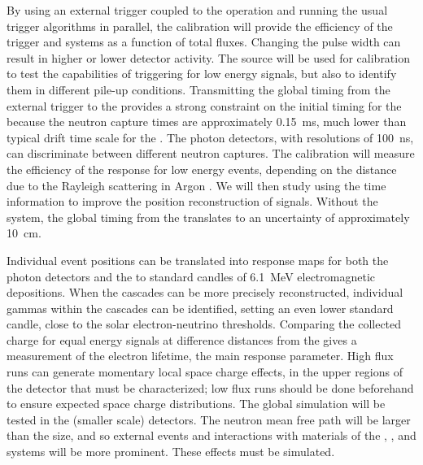 By using an external trigger coupled to the  operation and running the usual trigger algorithms in parallel, the calibration will provide the efficiency of the trigger and  systems as a function of total fluxes. Changing the pulse width can result in 
higher or lower detector activity. The source will be used for  calibration to test
the capabilities of triggering for low energy signals, but also 
to identify them in different pile-up conditions.
Transmitting the global timing from the external  trigger to the  provides a strong constraint on the initial timing for the 
because the neutron capture times are approximately \SI{0.15}{\milli\s}, much lower than typical drift time scale for the . The photon detectors, with resolutions of \SI{100}{\nano\s}, can discriminate between different neutron captures. The calibration will measure the efficiency of the  response for low energy events, depending on the distance due to the Rayleigh scattering in Argon . We will then study using the  time information to improve the position reconstruction of  signals. Without the  system, the global timing from the  translates to an uncertainty of approximately \SI{10}{\cm}.

Individual event positions can be translated into response maps for both the photon detectors and the  to standard candles of \SI{6.1}{\MeV} electromagnetic depositions. When the cascades can be more precisely reconstructed, individual gammas within the cascades can be identified, setting an even lower standard candle, close to the solar electron-neutrino thresholds. Comparing the collected charge for equal energy signals at difference distances from the  gives a measurement of the electron lifetime, the main response parameter. High  flux runs can generate momentary local space charge effects, in the
upper regions of the detector that must be characterized; low flux runs should be done beforehand to ensure 
expected space charge distributions.
The global simulation will be tested in the (smaller scale)  detectors. The neutron mean free path will be larger than the  size, and so 
external events and interactions with materials of the , , and  systems will be more prominent. These effects must be simulated.

